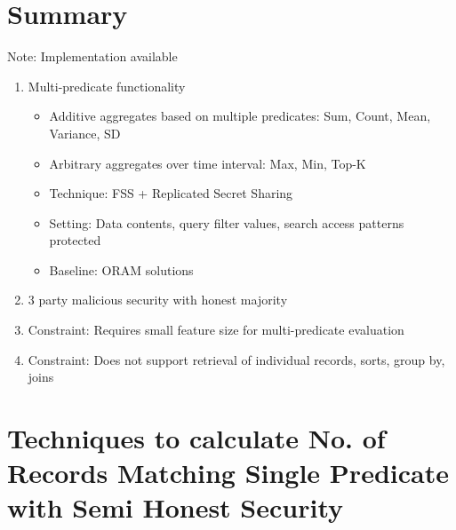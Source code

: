 
\clearpage
{}

%
\setcounter{section}{0} %

\section{Summary}
Note: Implementation available
\begin{enumerate}
   \item Multi-predicate functionality
    \begin{itemize}
        \item Additive aggregates based on multiple predicates: Sum, Count, Mean, Variance, SD
        \item Arbitrary aggregates over time interval: Max, Min, Top-K
        \item Technique: FSS + Replicated Secret Sharing
        \item Setting: Data contents, query filter values, search access patterns protected
        \item Baseline: ORAM solutions
    \end{itemize}
   \item 3 party malicious security with honest majority
   \item Constraint: Requires small feature size for multi-predicate evaluation
   \item Constraint: Does not support retrieval of individual records, sorts, group by, joins
\end{enumerate}

\section{Techniques to calculate No. of Records Matching Single Predicate with Semi Honest Security}

